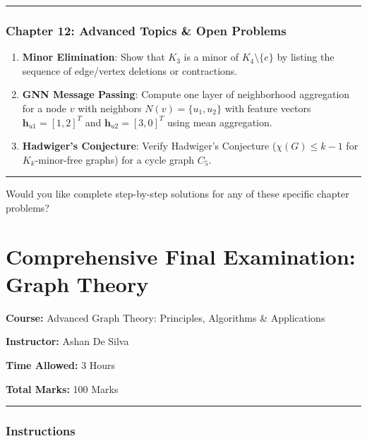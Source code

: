 \documentclass[
]{book}
\providecommand{\tightlist}{%
  \setlength{\itemsep}{0pt}\setlength{\parskip}{0pt}}
\theoremstyle{definition}
\theoremstyle{definition}
\theoremstyle{definition}
\theoremstyle{definition}
\theoremstyle{remark}
\begin{document}
\begin{center}\rule{0.5\linewidth}{0.5pt}\end{center}

\subsection{Chapter 12: Advanced Topics \& Open Problems}\label{chapter-12-advanced-topics-open-problems-1}

\begin{enumerate}
\def\labelenumi{\arabic{enumi}.}
\tightlist
\item
  \textbf{Minor Elimination}: Show that \(K_3\) is a minor of \(K_4 \setminus \{e\}\) by listing the sequence of edge/vertex deletions or contractions.
\item
  \textbf{GNN Message Passing}: Compute one layer of neighborhood aggregation for a node \(v\) with neighbors \(N(v) = \{u_1, u_2\}\) with feature vectors \(\mathbf{h}_{u1} = [1, 2]^T\) and \(\mathbf{h}_{u2} = [3, 0]^T\) using mean aggregation.
\item
  \textbf{Hadwiger's Conjecture}: Verify Hadwiger's Conjecture (\(\chi(G) \le k - 1\) for \(K_k\)-minor-free graphs) for a cycle graph \(C_5\).
\end{enumerate}

\begin{center}\rule{0.5\linewidth}{0.5pt}\end{center}

Would you like complete step-by-step solutions for any of these specific chapter problems?

\chapter{Comprehensive Final Examination: Graph Theory}\label{comprehensive-final-examination-graph-theory}

\textbf{Course:} Advanced Graph Theory: Principles, Algorithms \& Applications

\textbf{Instructor:} Ashan De Silva

\textbf{Time Allowed:} 3 Hours

\textbf{Total Marks:} 100 Marks

\begin{center}\rule{0.5\linewidth}{0.5pt}\end{center}

\subsection{Instructions}\label{instructions}
\end{document}
